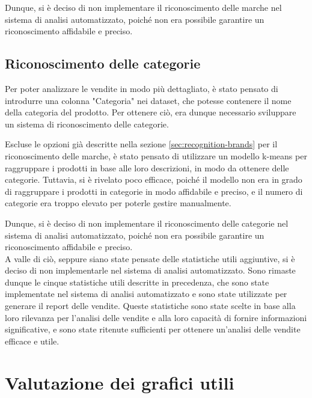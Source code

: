 Dunque, si è deciso di non implementare il riconoscimento delle marche nel sistema di analisi automatizzato, poiché non era possibile garantire un riconoscimento affidabile e preciso.

\subsection{Riconoscimento delle categorie}
\label{sec:recognition-categories}

Per poter analizzare le vendite in modo più dettagliato, è stato pensato di introdurre una colonna "Categoria" nei dataset, che potesse contenere il nome della categoria del prodotto. Per ottenere ciò, era dunque necessario sviluppare un sistema di riconoscimento delle categorie.

Escluse le opzioni già descritte nella sezione \ref{sec:recognition-brands} per il riconoscimento delle marche, è stato pensato di utilizzare un modello k-means per raggruppare i prodotti in base alle loro descrizioni, in modo da ottenere delle categorie. Tuttavia, si è rivelato poco efficace, poiché il modello non era in grado di raggruppare i prodotti in categorie in modo affidabile e preciso, e il numero di categorie era troppo elevato per poterle gestire manualmente.

Dunque, si è deciso di non implementare il riconoscimento delle categorie nel sistema di analisi automatizzato, poiché non era possibile garantire un riconoscimento affidabile e preciso.\\


A valle di ciò, seppure siano state pensate delle statistiche utili aggiuntive, si è deciso di non implementarle nel sistema di analisi automatizzato. Sono rimaste dunque le cinque statistiche utili descritte in precedenza, che sono state implementate nel sistema di analisi automatizzato e sono state utilizzate per generare il report delle vendite. Queste statistiche sono state scelte in base alla loro rilevanza per l'analisi delle vendite e alla loro capacità di fornire informazioni significative, e sono state ritenute sufficienti per ottenere un'analisi delle vendite efficace e utile.



\section{Valutazione dei grafici utili}
